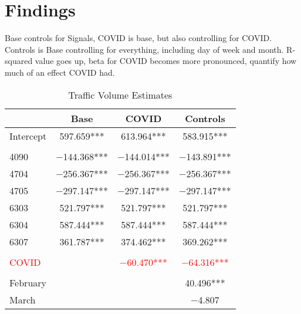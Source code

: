 \documentclass[3p, authoryear]{elsarticle} %
\begin{document}
\hypertarget{findings}{%
\section{Findings}\label{findings}}

Base controls for Signals, COVID is base, but also controlling for COVID. Controls is Base controlling for everything, including day of week and month. R-squared value goes up, beta for COVID becomes more pronounced, quantify how much of an effect COVID had.

\begin{table}

\caption{\label{tab:modeltab}Traffic Volume Estimates}
\centering
\begin{tabular}[t]{lccc}
\toprule
  & Base & COVID & Controls\\
\midrule
Intercept & \num{597.659}*** & \num{613.964}*** & \num{583.915}***\\
\addlinespace[0.3em]
\multicolumn{4}{l}{\textbf{Signal}}\\
\hspace{1em}4090 & \num{-144.368}*** & \num{-144.014}*** & \num{-143.891}***\\
\hspace{1em}4704 & \num{-256.367}*** & \num{-256.367}*** & \num{-256.367}***\\
\hspace{1em}4705 & \num{-297.147}*** & \num{-297.147}*** & \num{-297.147}***\\
\hspace{1em}6303 & \num{521.797}*** & \num{521.797}*** & \num{521.797}***\\
\hspace{1em}6304 & \num{587.444}*** & \num{587.444}*** & \num{587.444}***\\
\hspace{1em}6307 & \num{361.787}*** & \num{374.462}*** & \num{369.262}***\\
\addlinespace[0.3em]
\multicolumn{4}{l}{\textbf{COVID-19}}\\
\hspace{1em}\textcolor{red}{COVID} & \textcolor{red}{} & \textcolor{red}{\num{-60.470}***} & \textcolor{red}{\num{-64.316}***}\\
\addlinespace[0.3em]
\multicolumn{4}{l}{\textbf{Month}}\\
\hspace{1em}February &  &  & \num{40.496}***\\
\hspace{1em}March &  &  & \num{-4.807}\\

\end{tabular}
\end{table}
\end{document}
